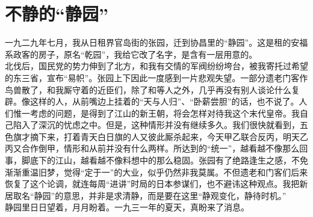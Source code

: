 \fancyhead[RO]{} %
\fancyhead[LE]{} %
\chapter*{不静的“静园”}
\thispagestyle{empty}
一九二九年七月，我从日租界官岛街的张园，迁到协昌里的“静园”。这是租的安福系政客的房子，原名“乾园”，我给它改了名字，是含有一层用意的。\\

北伐后，国民党的势力伸到了北方，和我有交情的军阀纷纷垮台，被我寄托过希望的东三省，宣布“易帜”。张园上下因此一度感到一片悲观失望。一部分遗老门客作鸟兽散了，和我厮守着的近臣们，除了和等人之外，几乎再没有别人谈论什么复辟。像这样的人，从前嘴边上挂着的“天与人归”、“卧薪尝胆”的话，也不说了。人们惟一考虑的问题，是得到了江山的新王朝，将会怎样对待我这个末代皇帝。我自己陷入了深沉的忧虑之中。但是，这种情形并没有继续多久。我们很快就看到，五色旗才摘下来，打着青天白日旗的人又彼此厮杀起来，今天甲乙联合反丙，明天乙丙又合作倒甲，情形和从前并没有什么两样。所达到的“统一”，越看越不像那么回事，脚底下的江山，越看越不像料想中的那么稳固。张园有了绝路逢生之感，不免渐渐重温旧梦，觉得“定于一”的大业，似乎仍然非我莫属。不但遗老和门客们后来恢复了这个论调，就连每周“进讲”时局的日本参谋们，也不避讳这种观点。我把新居取名“静园”的意思，并非是求清静，而是要在这里“静观变化，静待时机。”\\

静园里日日望着，月月盼着。一九三一年的夏天，真盼来了消息。\\

